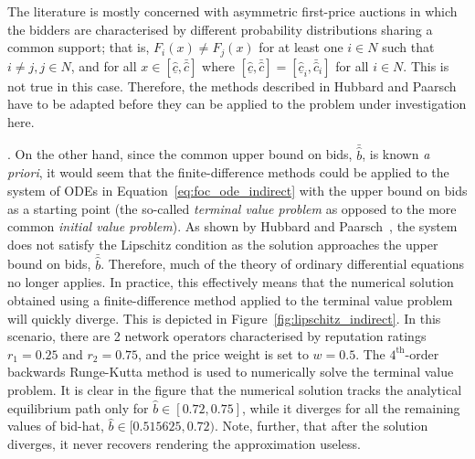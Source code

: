 The literature is mostly concerned with asymmetric first-price auctions in which the bidders are characterised by different probability distributions sharing a common support; that is, $F_i(x)\neq F_j(x)$ for at least one $i\in N$ such that $i\neq j, j\in N$, and for all $x\in [\underline{\hat{c}}, \bar{\hat{c}}]$ where $[\underline{\hat{c}}, \bar{\hat{c}}] = [\underline{\hat{c}}_i, \bar{\hat{c}}_i]$ for all $i\in N$. This is not true in this case. Therefore, the methods described in Hubbard and Paarsch~\cite{HubbardPaarsch2011} have to be adapted before they can be applied to the problem under investigation here.

. On the other hand, since the common upper bound on bids, $\bar{\hat{b}}$, is known \emph{a priori}, it would seem that the finite-difference methods could be applied to the system of ODEs in Equation~\eqref{eq:foc_ode_indirect} with the upper bound on bids as a starting point (the so-called \emph{terminal value problem} as opposed to the more common \emph{initial value problem}). As shown by Hubbard and Paarsch~\cite{HubbardPaarsch2011}, the system does not satisfy the Lipschitz condition as the solution approaches the upper bound on bids, $\bar{\hat{b}}$. Therefore, much of the theory of ordinary differential equations no longer applies. In practice, this effectively means that the numerical solution obtained using a finite-difference method applied to the terminal value problem will quickly diverge. This is depicted in Figure~\ref{fig:lipschitz_indirect}. In this scenario, there are 2 network operators characterised by reputation ratings $r_1 = 0.25$ and $r_2 = 0.75$, and the price weight is set to $w=0.5$. The $4^{\textrm{th}}$-order backwards Runge-Kutta method is used to numerically solve the terminal value problem. It is clear in the figure that the numerical solution tracks the analytical equilibrium path only for $\hat{b}\in [0.72, 0.75]$, while it diverges for all the remaining values of bid-hat, $\hat{b}\in [0.515625, 0.72)$. Note, further, that after the solution diverges, it never recovers rendering the approximation useless.


